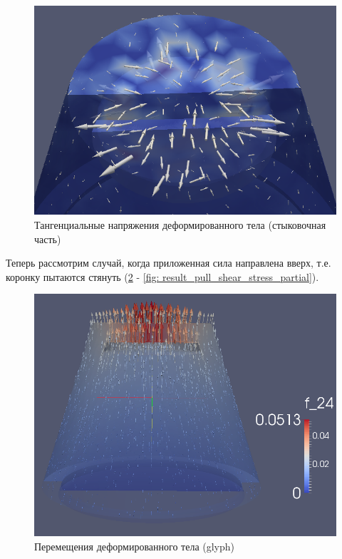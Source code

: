 \documentclass[a4paper, 14pt]{extreport}
\begin{document}
\begin{figure}[H]
	\center
	\includegraphics[scale=0.55]{pictures/result_push_shear_stress_partial.png}
	\caption{Тангенциальные напряжения деформированного тела (стыковочная часть)}
	\label{fig: result_push_shear_stress_partial}
\end{figure}

\newpage
Теперь рассмотрим случай, когда приложенная сила направлена вверх, т.е. коронку
пытаются стянуть (\ref{fig: result_pull_displacement_glyph} - \ref{fig: result_pull_shear_stress_partial}).

\begin{figure}[H]
	\center
	\includegraphics[scale=0.4]{pictures/result_pull_displacement_glyph.png}
	\caption{Перемещения деформированного тела (glyph)}
	\label{fig: result_pull_displacement_glyph}
\end{figure}
\end{document}
